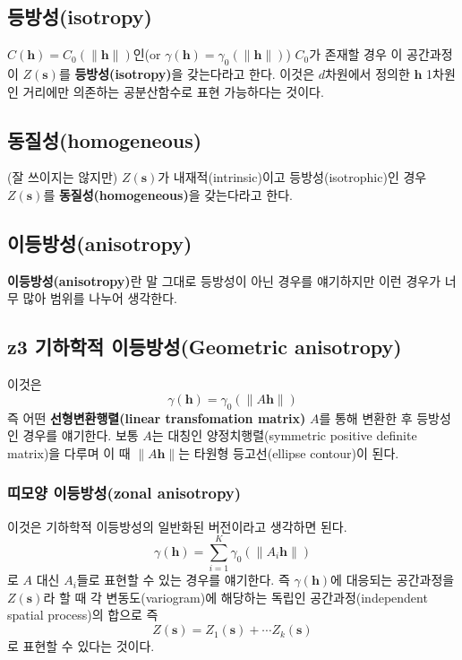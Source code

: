 \documentclass[b5paper,]{scrbook}
\theoremstyle{plain}
\theoremstyle{definition}
\numberwithin{equation}{section}
\begin{document}
\subsection{등방성(isotropy)}\label{isotropy}

\(C(\mathbf{h})=C_{0}(\|\mathbf{h}\|)\)인(or
\(\gamma(\mathbf{h})=\gamma_{0}(\|\mathbf{h}\|)\)) \(C_{0}\)가 존재할
경우 이 공간과정이 \(Z(\mathbf{s})\)를 \textbf{등방성(isotropy)}을
갖는다라고 한다. 이것은 \(d\)차원에서 정의한 \(\mathbf{h}\) 1차원인
거리에만 의존하는 공분산함수로 표현 가능하다는 것이다.

\subsection{동질성(homogeneous)}\label{homogeneous}

(잘 쓰이지는 않지만) \(Z(\mathbf{s})\)가 내재적(intrinsic)이고
등방성(isotrophic)인 경우 \(Z(\mathbf{s})\)를
\textbf{동질성(homogeneous)}을 갖는다라고 한다.

\subsection{이등방성(anisotropy)}\label{anisotropy}

\textbf{이등방성(anisotropy)}란 말 그대로 등방성이 아닌 경우를
얘기하지만 이런 경우가 너무 많아 범위를 나누어 생각한다.

\subsection{z3 기하학적 이등방성(Geometric
anisotropy)}\label{z3--geometric-anisotropy}

이것은 \[\gamma(\mathbf{h})=\gamma_{0}(\|A\mathbf{h}\|)\] 즉 어떤
\textbf{선형변환행렬(linear transfomation matrix)} \(A\)를 통해 변환한
후 등방성인 경우를 얘기한다. 보통 \(A\)는 대칭인 양정치행렬(symmetric
positive definite matrix)을 다루며 이 때 \(\|A\mathbf{h}\|\)는 타원형
등고선(ellipse contour)이 된다.

\subsubsection{띠모양 이등방성(zonal
anisotropy)}\label{-zonal-anisotropy}

이것은 기하학적 이등방성의 일반화된 버전이라고 생각하면 된다.
\[\gamma(\mathbf{h})=\sum_{i=1}^{K}\gamma_{0}(\|A_{i}\mathbf{h}\|)\] 로
\(A\) 대신 \(A_{i}\)들로 표현할 수 있는 경우를 얘기한다. 즉
\(\gamma(\mathbf{h})\)에 대응되는 공간과정을 \(Z(\mathbf{s})\)라 할 때
각 변동도(variogram)에 해당하는 독립인 공간과정(independent spatial
process)의 합으로 즉
\[Z(\mathbf{s})=Z_{1}(\mathbf{s})+ \cdots Z_{k}(\mathbf{s})\] 로 표현할
수 있다는 것이다.
\end{document}
